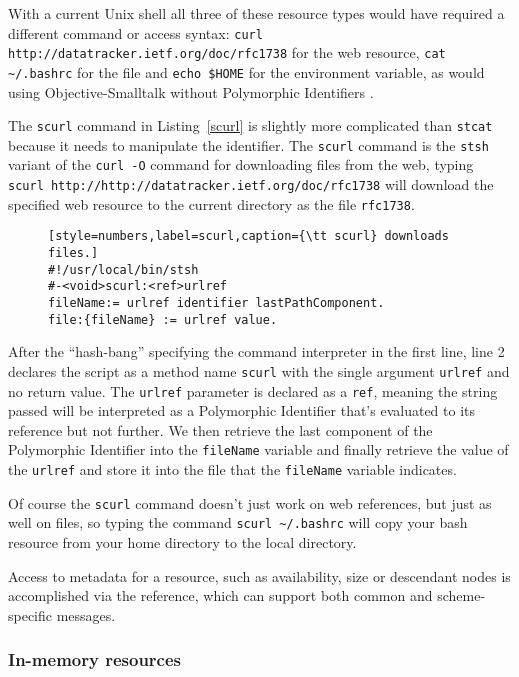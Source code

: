 \documentclass[preprint,authoryear]{llncs}
\begin{document}
With a current Unix shell all three of these resource types would have required a different
command or access syntax:   {\tt curl http://datatracker.ietf.org/doc/rfc1738} for the
web resource, {\tt cat  \~\//.bashrc} for the file and {\tt echo \$HOME} for the environment
variable, as would using Objective-Smalltalk without Polymorphic Identifiers .

The {\tt scurl} command in Listing~\ref{scurl} is slightly more complicated than {\tt stcat} because
it needs to manipulate the identifier.  The {\tt scurl} command
is the {\tt stsh} variant of the {\tt curl -O} command for downloading files from the web, typing
{\tt scurl http://http://datatracker.ietf.org/doc/rfc1738} will download the specified web resource
to the current directory as the file {\tt rfc1738}.

\begin{figure}[htbp]
\begin{lstlisting}[style=numbers,label=scurl,caption={\tt scurl} downloads files.]
#!/usr/local/bin/stsh
#-<void>scurl:<ref>urlref
fileName:= urlref identifier lastPathComponent.
file:{fileName} := urlref value.
\end{lstlisting}
\end{figure}

After the ``hash-bang'' specifying the command interpreter in the first line, line 2 declares
the script as a method name {\tt scurl} with the single argument {\tt urlref} and no return
value.  The {\tt urlref} parameter is declared as a {\tt ref}, meaning the string passed will
be interpreted as a Polymorphic Identifier that's evaluated to its reference but not further.
We then retrieve the last component of the Polymorphic Identifier into the {\tt fileName}
variable and finally retrieve the value of the {\tt urlref} and store it into the file that
the {\tt fileName} variable indicates.

Of course the {\tt scurl} command doesn't just work on web references, but just as well
on files, so typing the command {\tt scurl \~\//.bashrc} will copy your bash resource from your home directory
to the local directory.

Access to metadata for a resource, such as availability, size or descendant nodes
is accomplished via the reference, which can support both common and scheme-specific
messages.

\subsubsection{In-memory resources}
\label{inmemory}
\end{document}
